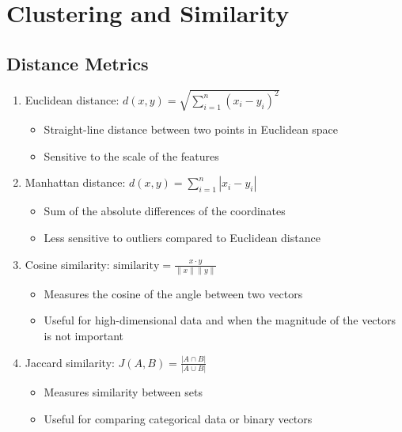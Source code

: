 \documentclass{article}
\begin{document}
\section{Clustering and Similarity}

\subsection{Distance Metrics}
\begin{enumerate}
    \item Euclidean distance: $d(x,y) = \sqrt{\sum_{i=1}^n (x_i - y_i)^2}$
    \begin{itemize}
        \item Straight-line distance between two points in Euclidean space
        \item Sensitive to the scale of the features
    \end{itemize}
    
    \item Manhattan distance: $d(x,y) = \sum_{i=1}^n |x_i - y_i|$
    \begin{itemize}
        \item Sum of the absolute differences of the coordinates
        \item Less sensitive to outliers compared to Euclidean distance
    \end{itemize}
    
    \item Cosine similarity: $\text{similarity} = \frac{x \cdot y}{\|x\| \|y\|}$
    \begin{itemize}
        \item Measures the cosine of the angle between two vectors
        \item Useful for high-dimensional data and when the magnitude of the vectors is not important
    \end{itemize}
    
    \item Jaccard similarity: $J(A,B) = \frac{|A \cap B|}{|A \cup B|}$
    \begin{itemize}
        \item Measures similarity between sets
        \item Useful for comparing categorical data or binary vectors
    \end{itemize}
\end{enumerate}
\end{document}
